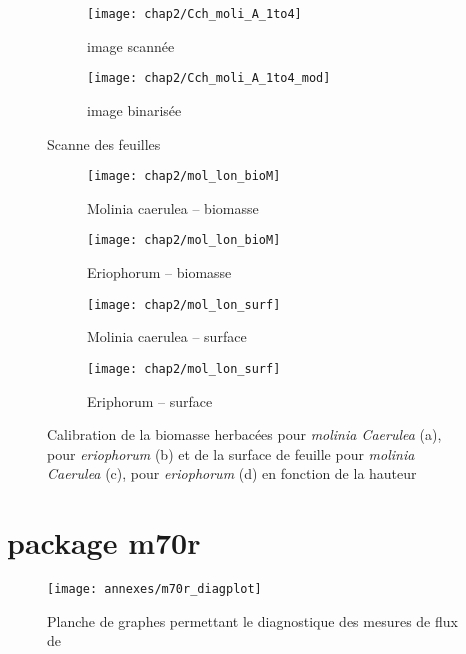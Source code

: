 \begin{figure}
	\centering
	\begin{subfigure}[t]{0.5\textwidth}
		\centering
		\texttt{[image: chap2/Cch\_moli\_A\_1to4]}
		\caption{image scannée}
	\end{subfigure}%
	\begin{subfigure}[t]{0.5\textwidth}
		\centering
		\texttt{[image: chap2/Cch\_moli\_A\_1to4\_mod]}
		\caption{image binarisée}
	\end{subfigure}
\caption{Scanne des feuilles}
\label{fig:scan_mol}
\end{figure}


\begin{figure}
	\centering
	\begin{subfigure}[t]{0.5\textwidth}
		\centering
		\texttt{[image: chap2/mol\_lon\_bioM]}
		\caption{Molinia caerulea -- biomasse}
	\end{subfigure}%
	\begin{subfigure}[t]{0.5\textwidth}
		\centering
		\texttt{[image: chap2/mol\_lon\_bioM]}
		\caption{Eriophorum -- biomasse}
	\end{subfigure}
	
	
	\begin{subfigure}[t]{0.5\textwidth}
		\centering
		\texttt{[image: chap2/mol\_lon\_surf]}
		\caption{Molinia caerulea -- surface}
	\end{subfigure}%
	\begin{subfigure}[t]{0.5\textwidth}
		\centering
		\texttt{[image: chap2/mol\_lon\_surf]}
		\caption{Eriphorum -- surface}
	\end{subfigure}
\caption{Calibration de la biomasse herbacées pour \textit{molinia Caerulea} (a), pour \textit{eriophorum} (b) et de la surface de feuille pour \textit{molinia Caerulea} (c), pour \textit{eriophorum} (d) en fonction de la hauteur}
\label{fig:cal_herb}
\end{figure}




\section{package m70r}
\label{sec:pckg_m70r}

\begin{figure}
\centering
\texttt{[image: annexes/m70r\_diagplot]}
\caption{Planche de graphes permettant le diagnostique des mesures de flux de \coo}
\label{fig:m70r_diagplot}
\end{figure}

